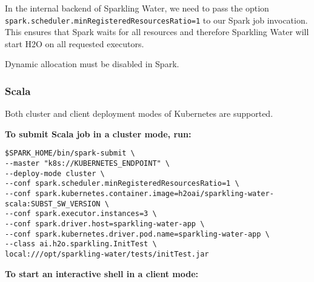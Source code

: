 In the internal backend of Sparkling Water, we need to pass the option \texttt{spark.scheduler.minRegisteredResourcesRatio=1}
to our Spark job invocation. This ensures that Spark waits for all resources and therefore Sparkling Water will
start H2O on all requested executors.

Dynamic allocation must be disabled in Spark.

\subsubsection{Scala}

Both cluster and client deployment modes of Kubernetes are supported.

\textbf{To submit Scala job in a cluster mode, run:}

\begin{lstlisting}[style=Bash]
$SPARK_HOME/bin/spark-submit \
--master "k8s://KUBERNETES_ENDPOINT" \
--deploy-mode cluster \
--conf spark.scheduler.minRegisteredResourcesRatio=1 \
--conf spark.kubernetes.container.image=h2oai/sparkling-water-scala:SUBST_SW_VERSION \
--conf spark.executor.instances=3 \
--conf spark.driver.host=sparkling-water-app \
--conf spark.kubernetes.driver.pod.name=sparkling-water-app \
--class ai.h2o.sparkling.InitTest \
local:///opt/sparkling-water/tests/initTest.jar
\end{lstlisting}

\textbf{To start an interactive shell in a client mode:}

